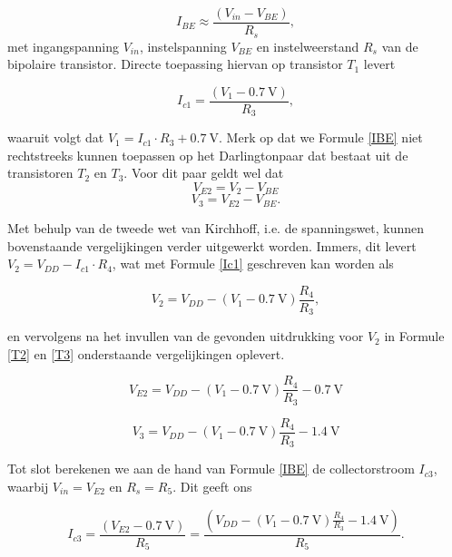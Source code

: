 \documentclass{report}
\begin{document}
\begin{equation}
I_{BE} \approx \frac{(V_{in} - V_{BE})}{R_s},
\label{IBE}
\end{equation}
met ingangspanning $V_{in}$, instelspanning $V_{BE}$ en instelweerstand $R_s$ van de bipolaire transistor. Directe toepassing hiervan op transistor $T_1$ levert

\begin{equation}
I_{c1}=\frac{(V_{1}-\SI{0.7}{\volt})}{R_3},
\label{Ic1}
\end{equation}

waaruit volgt dat $V_1 = I_{c1}\cdot R_3 + \SI{0.7}{\volt} $. Merk op dat we Formule \ref{IBE} niet rechtstreeks kunnen toepassen op het Darlingtonpaar dat bestaat uit de transistoren $T_2$ en $T_3$. Voor dit paar geldt wel dat
\begin{equation}
V_{E2} = V_2 - V_{BE}
\label{T2}
\end{equation}
\begin{equation}
V_3 = V_{E2} - V_{BE}.
\label{T3}
\end{equation}

Met behulp van de tweede wet van Kirchhoff, i.e. de spanningswet, kunnen bovenstaande vergelijkingen verder uitgewerkt worden. Immers, dit levert $V_2 = V_{DD} - I_{c1} \cdot R_4$, wat met Formule \ref{Ic1} geschreven kan worden als

\begin{equation}
V_2 = V_{DD} - (V_1 - \SI{0.7}{\volt})\frac{R_4}{R_3},
\end{equation}

en vervolgens na het invullen van de gevonden uitdrukking voor $V_2$ in Formule \ref{T2} en \ref{T3} onderstaande vergelijkingen oplevert.

\begin{equation}
V_{E2} = V_{DD} - (V_1 - \SI{0.7}{\volt})\frac{R_4}{R_3} - \SI{0.7}{\volt}
\end{equation}

\begin{equation}
V_3 = V_{DD} - (V_1 - \SI{0.7}{\volt})\frac{R_4}{R_3} - \SI{1.4}{\volt}
\end{equation}

Tot slot berekenen we aan de hand van Formule \ref{IBE} de collectorstroom $I_{c3}$, waarbij $V_{in} = V_{E2}$ en $R_s = R_5$. Dit geeft ons

\begin{equation}
I_{c3}=\frac{(V_{E2} - \SI{0.7}{\volt})}{R_5}=\frac{(V_{DD}- (V_{1}-\SI{0.7}{\volt})\frac{R_4}{R_3}-\SI{1.4}{\volt})}{R_5}.
\end{equation}
\end{document}
